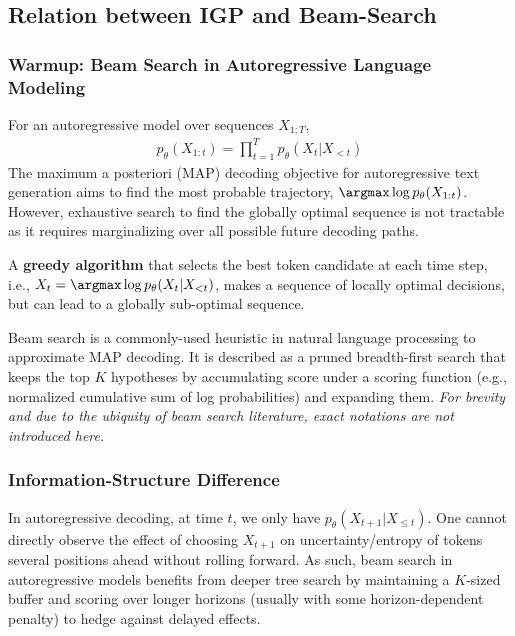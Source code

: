 \subsection{Relation between IGP and Beam-Search}

\subsubsection{Warmup: Beam Search in Autoregressive Language Modeling}
For an autoregressive model over sequences $X_{1;T}$,
\begin{align}
    p_\theta(X_{1:t}) = \prod_{t=1}^Tp_\theta(X_t|X_{<t})
\end{align}
The maximum a posteriori (MAP) decoding objective for autoregressive text generation aims to find the most probable trajectory, $\argmax \log p_\theta(X_{1:t})$. However, exhaustive search to find the globally optimal sequence is not tractable as it requires marginalizing over all possible future decoding paths.

A \textbf{greedy algorithm} that selects the best token candidate at each time step, i.e., $X_t = \argmax \log p_\theta(X_t|X_{<t})$, makes
a sequence of locally optimal decisions, but can lead to a globally sub-optimal sequence.

Beam search is a commonly-used heuristic in natural language processing to approximate MAP decoding. It is described as a pruned breadth-first search that keeps the top $K$ hypotheses by accumulating score under a scoring function (e.g., normalized cumulative sum of log probabilities) and expanding them. \emph{For brevity and due to the ubiquity of beam search literature, exact notations are not introduced here.}



\subsubsection{Information-Structure Difference}
In autoregressive decoding, at time $t$, we only have $p_\theta(X_{t+1}|X_{\leq t})$. One cannot directly observe the effect of choosing $X_{t+1}$ on uncertainty/entropy of tokens several positions ahead without rolling forward. As such, beam search in autoregressive models benefits from deeper tree search by maintaining a $K$-sized buffer and scoring over longer horizons (usually with some horizon-dependent penalty) to hedge against delayed effects.

